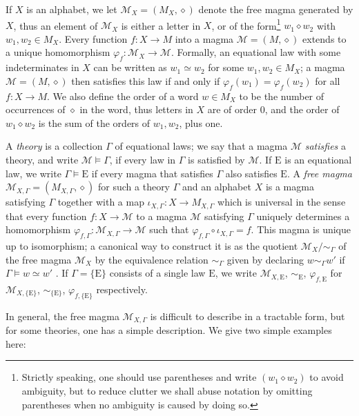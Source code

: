 \documentclass[12pt]{amsart}
\theoremstyle{definition}
\newcommand{\op}{\diamond}
\newcommand{\formaleq}{\simeq}
\newcommand{\Magma}{{\mathcal{M}}}
\newcommand{\E}{\mathrm{E}}
\begin{document}
If $X$ is an alphabet, we let $\Magma_X = (M_X, \diamond)$ denote the free magma generated by $X$, thus an element of $\Magma_X$ is either a letter in $X$, or of the form\footnote{Strictly speaking, one should use parentheses and write $(w_1 \op w_2)$ to avoid ambiguity, but to reduce clutter we shall abuse notation by omitting parentheses when no ambiguity is caused by doing so.} $w_1 \op w_2$ with $w_1,w_2 \in M_X$.  Every function $f \colon X \to M$ into a magma $\Magma = (M,\op)$ extends to a unique homomorphism $\varphi_f \colon \Magma_X \to \Magma$.  Formally, an equational law with some indeterminates in $X$ can be written as $w_1 \formaleq w_2$ for some $w_1, w_2 \in M_X$; a magma $\Magma = (M,\op)$ then satisfies this law if and only if $\varphi_f(w_1) = \varphi_f(w_2)$ for all $f \colon X \to M$.  We also define the order of a word $w \in M_X$ to be the number of occurrences of $\op$ in the word, thus letters in $X$ are of order $0$, and the order of $w_1 \op w_2$ is the sum of the orders of $w_1, w_2$, plus one.

A \emph{theory} is a collection $\Gamma$ of equational laws; we say that a magma $\Magma$ \emph{satisfies} a theory, and write $\Magma \models \Gamma$, if every law in $\Gamma$ is satisfied by $\Magma$.  If $\E$ is an equational law, we write $\Gamma \models \E$ if every magma that satisfies $\Gamma$ also satisfies $\E$.  A \emph{free magma} $\Magma_{X,\Gamma} = (M_{X,\Gamma},\diamond)$ for such a theory $\Gamma$ and an alphabet $X$ is a magma satisfying $\Gamma$ together with a map $\iota_{X,\Gamma} \colon X \to M_{X,\Gamma}$ which is universal in the sense that every function $f \colon X \to \Magma$ to a magma $\Magma$ satisfying $\Gamma$ uniquely determines a homomorphism $\varphi_{f,\Gamma} \colon \Magma_{X,\Gamma} \to \Magma$ such that $\varphi_{f,\Gamma} \circ \iota_{X,\Gamma} = f$.  This magma is unique up to isomorphism; a canonical way to construct it is as the quotient $\Magma_X/\sim_\Gamma$ of the free magma $\Magma_X$ by the equivalence relation $\sim_\Gamma$ given by declaring $w \sim_\Gamma w'$ if $\Gamma \models w \formaleq w'$ \cite[Theorem 3.5.6]{term-rewriting}.  If $\Gamma = \{\E\}$ consists of a single law $\E$, we write $\Magma_{X,\E}$, $\sim_\E$, $\varphi_{f,\E}$ for $\Magma_{X,\{\E\}}$, $\sim_{\{\E\}}$, $\varphi_{f,\{\E\}}$ respectively.

In general, the free magma $\Magma_{X,\Gamma}$ is difficult to describe in a tractable form, but for some theories, one has a simple description.  We give two simple examples here:
\end{document}
